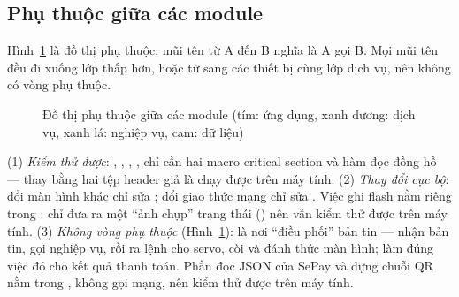 \subsection{Phụ thuộc giữa các module}
Hình~\ref{fig:deps} là đồ thị phụ thuộc: mũi tên từ A đến B nghĩa là A gọi B. Mọi
mũi tên đều đi xuống lớp thấp hơn, hoặc từ  sang các thiết bị cùng
lớp dịch vụ, nên không có vòng phụ thuộc.

\begin{figure}[H]
\centering
{}
\caption{Đồ thị phụ thuộc giữa các module (tím: ứng dụng, xanh dương: dịch vụ, xanh lá: nghiệp vụ, cam: dữ liệu)}\label{fig:deps}
\end{figure}

\begin{lydo}
(1) \emph{Kiểm thử được}: , , ,
,  chỉ cần hai macro critical section và hàm đọc đồng hồ — thay bằng
hai tệp header giả là chạy được trên máy tính. (2) \emph{Thay đổi cục bộ}: đổi màn hình
khác chỉ sửa ; đổi giao thức mạng chỉ sửa .
Việc ghi flash nằm riêng trong :  chỉ đưa ra
một ``ảnh chụp'' trạng thái () nên vẫn kiểm thử được trên máy tính.
(3) \emph{Không vòng phụ thuộc} (Hình~\ref{fig:deps}):  là nơi
``điều phối'' bản tin — nhận bản tin, gọi nghiệp vụ, rồi ra lệnh cho servo, còi và đánh
thức màn hình;  làm đúng việc đó cho kết quả thanh toán. Phần đọc
JSON của SePay và dựng chuỗi QR nằm trong , không gọi mạng, nên kiểm thử
được trên máy tính.
\end{lydo}

